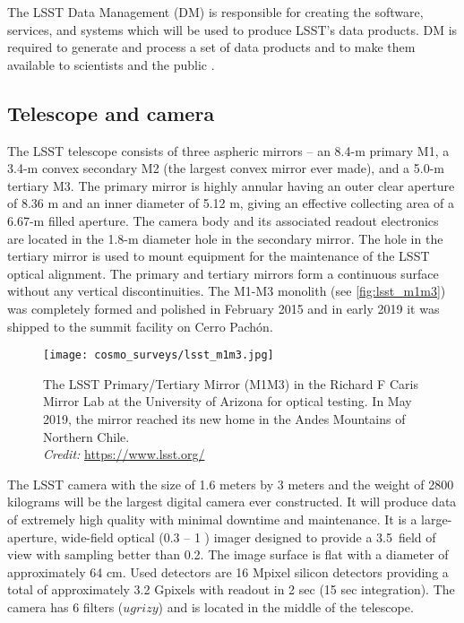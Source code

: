 The LSST Data Management (DM) is responsible for creating the software, services, and systems which will be used to produce LSST's data products. DM is required to generate and process a set of data products and to make them available to scientists and the public \parencite{LSST_DM}.

\subsection{Telescope and camera}
The LSST telescope consists of three aspheric mirrors -- an 8.4-m primary M1, a 3.4-m convex secondary M2 (the largest convex mirror ever made), and a 5.0-m tertiary M3. The primary mirror is highly annular having an outer clear aperture of 8.36 m and an inner diameter of 5.12 m, giving an effective collecting area of a 6.67-m filled aperture. The camera body and its associated readout electronics are located in the 1.8-m diameter hole in the secondary mirror.  The hole in the tertiary mirror is used to mount equipment for the maintenance of the LSST optical alignment. The primary and tertiary mirrors form a continuous surface without any vertical discontinuities. The M1-M3 monolith (see \autoref{fig:lsst_m1m3}) was completely formed and polished in February 2015 and in early 2019 it was shipped to the summit facility on Cerro Pach\'{o}n.
\begin{figure}[htb]
    \centering
    \texttt{[image: cosmo\_surveys/lsst\_m1m3.jpg]}
    \caption{The LSST Primary/Tertiary Mirror (M1M3) in the Richard F Caris Mirror Lab at the University of Arizona for optical testing. In May 2019, the mirror reached its new home in the Andes Mountains of Northern Chile.\\\textit{Credit:} \url{https://www.lsst.org/}}
    \label{fig:lsst_m1m3}
\end{figure}

The LSST camera with the size of 1.6 meters by 3 meters and the weight of 2800 kilograms will be the largest digital camera ever constructed. It will produce data of extremely high quality with minimal downtime and maintenance. It is a large-aperture, wide-field optical (0.3 -- 1 \um) imager designed to provide a 3.5\textdegree\ field of view with sampling better than 0.2\arcsec. The image surface is flat with a diameter of approximately 64 cm. Used detectors are 16 Mpixel silicon detectors providing a total of approximately 3.2 Gpixels with readout in 2 sec (15 sec integration). The camera has 6 filters ($ugrizy$) and is located in the middle of the telescope.

